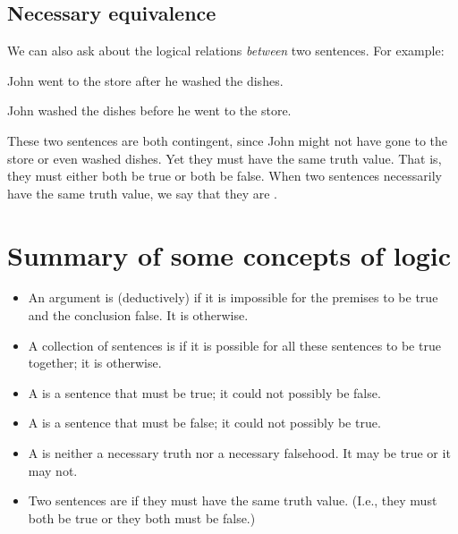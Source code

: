 \subsection{Necessary equivalence}

We can also ask about the logical relations \emph{between} two sentences. For example:
\begin{earg}
\item[] John went to the store after he washed the dishes.
\item[] John washed the dishes before he went to the store.
\end{earg}
These two sentences are both contingent, since John might not have gone to the store or even washed dishes. Yet they must have the same truth value. That is, they must either both be true or both be false. When two sentences necessarily have the same truth value, we say that they are .


\section*{Summary of some concepts of logic}

\begin{itemize}
\item[] An argument is (deductively)  if it is impossible for the premises to be true and the conclusion false. It is  otherwise.

\item[] A collection of sentences is  if it is possible for all these sentences to be true together; it is  otherwise.

\item[] A  is a sentence that must be true; it could not possibly be false.

\item[] A  is a sentence that must be false; it could not possibly be true.

\item[] A  is neither a necessary truth nor a necessary falsehood. It may be true or it may not.

\item[] Two sentences are  if they must have the same truth value. (I.e., they must both be true or they both must be false.)
\end{itemize}

